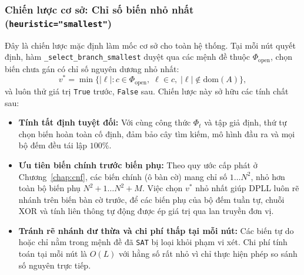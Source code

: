 \subsubsection{Chiến lược cơ sở: Chỉ số biến nhỏ nhất (\texttt{heuristic="smallest"})}
Đây là chiến lược mặc định làm mốc cơ sở cho toàn hệ thống. Tại mỗi nút quyết định, hàm \texttt{\_select\_branch\_smallest} duyệt qua các mệnh đề thuộc $\Phi_{\text{open}}$, chọn biến chưa gán có chỉ số nguyên dương nhỏ nhất:
\begin{equation}
    v^* = \min \big\{ | \ell | : c \in \Phi_{\text{open}},\; \ell \in c,\; |\ell| \notin \text{dom}(A) \big\},
\end{equation}
và luôn thử giá trị \texttt{True} trước, \texttt{False} sau. Chiến lược này sở hữu các tính chất sau:
\begin{itemize}
    \item \textbf{Tính tất định tuyệt đối:} Với cùng công thức $\Phi_t$ và tập giả định, thứ tự chọn biến hoàn toàn cố định, đảm bảo cây tìm kiếm, mô hình đầu ra và mọi bộ đếm đều tái lập $100\%$.
    \item \textbf{Ưu tiên biến chính trước biến phụ:} Theo quy ước cấp phát ở Chương~\ref{chap:cnf}, các biến chính (ô bàn cờ) mang chỉ số $1 \dots N^2$, nhỏ hơn toàn bộ biến phụ $N^2 + 1 \dots N^2 + M$. Việc chọn $v^*$ nhỏ nhất giúp DPLL luôn rẽ nhánh trên biến bàn cờ trước, để các biến phụ của bộ đếm tuần tự, chuỗi XOR và tính liên thông tự động được ép giá trị qua lan truyền đơn vị.
    \item \textbf{Tránh rẽ nhánh dư thừa và chi phí thấp tại mỗi nút:} Các biến tự do hoặc chỉ nằm trong mệnh đề đã \texttt{SAT} bị loại khỏi phạm vi xét. Chi phí tính toán tại mỗi nút là $O(L)$ với hằng số rất nhỏ vì chỉ thực hiện phép so sánh số nguyên trực tiếp.
\end{itemize}

